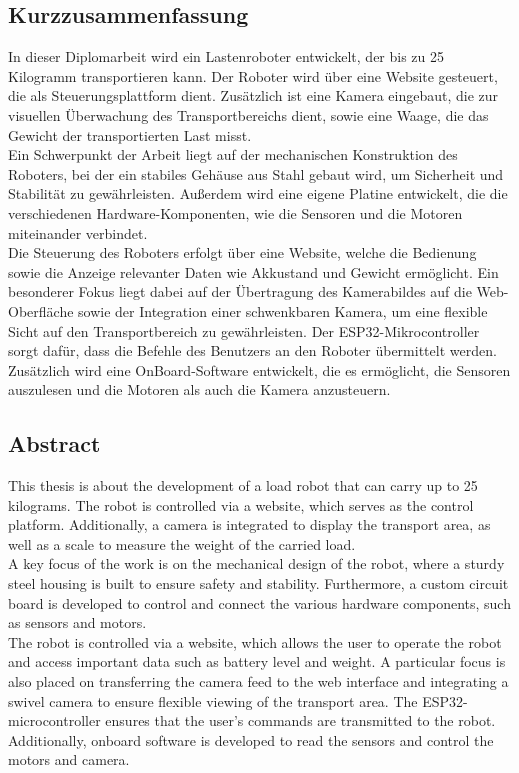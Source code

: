 \documentclass[ngerman,12pt,a4paper]{article}
\begin{document}
	\subsection{Kurzzusammenfassung}
	In dieser Diplomarbeit wird ein Lastenroboter entwickelt, der bis zu 25 Kilogramm transportieren kann. Der Roboter wird über eine Website gesteuert, die als Steuerungsplattform dient. Zusätzlich ist eine Kamera eingebaut, die zur visuellen Überwachung des Transportbereichs dient, sowie eine Waage, die das Gewicht der transportierten Last misst.\\[0.5 cm]
	Ein Schwerpunkt der Arbeit liegt auf der mechanischen Konstruktion des Roboters, bei der ein stabiles Gehäuse aus Stahl gebaut wird, um Sicherheit und Stabilität zu gewährleisten. Außerdem wird eine eigene Platine entwickelt, die die verschiedenen Hardware-Komponenten, wie die Sensoren und die Motoren miteinander verbindet.\\[0.5 cm]
	Die Steuerung des Roboters erfolgt über eine Website, welche die Bedienung sowie die Anzeige relevanter Daten wie Akkustand und Gewicht ermöglicht. Ein besonderer Fokus liegt dabei auf der Übertragung des Kamerabildes auf die Web-Oberfläche sowie der Integration einer schwenkbaren Kamera, um eine flexible Sicht auf den Transportbereich zu gewährleisten. Der ESP32-Mikrocontroller sorgt dafür, dass die Befehle des Benutzers an den Roboter übermittelt werden.\\[0.5 cm]
	Zusätzlich wird eine OnBoard-Software entwickelt, die es ermöglicht, die Sensoren auszulesen und die Motoren als auch die Kamera anzusteuern.\\[0.5 cm]
	
	\newpage
	
	\subsection{Abstract}
	
	This thesis is about the development of a load robot that can carry up to 25 kilograms. The robot is controlled via a website, which serves as the control platform. Additionally, a camera is integrated to display the transport area, as well as a scale to measure the weight of the carried load.\\[0.5 cm]
	A key focus of the work is on the mechanical design of the robot, where a sturdy steel housing is built to ensure safety and stability. Furthermore, a custom circuit board is developed to control and connect the various hardware components, such as sensors and motors.\\[0.5 cm]
	The robot is controlled via a website, which allows the user to operate the robot and access important data such as battery level and weight. A particular focus is also placed on transferring the camera feed to the web interface and integrating a swivel camera to ensure flexible viewing of the transport area. The ESP32-microcontroller ensures that the user's commands are transmitted to the robot.\\[0.5 cm]
	Additionally, onboard software is developed to read the sensors and control the motors and camera.
	\fancyfoot[L]{}
	\thispagestyle{fancy}
	\newpage
\end{document}
